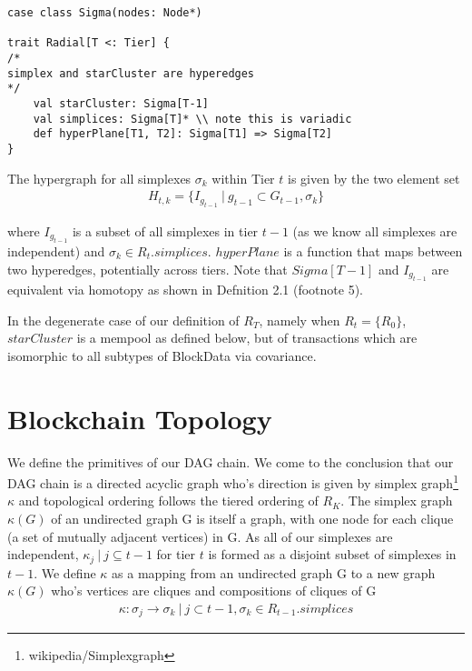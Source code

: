 \documentclass{article}
\begin{document}
\begin{lstlisting}
case class Sigma(nodes: Node*)

trait Radial[T <: Tier] {
/*
simplex and starCluster are hyperedges
*/
	val starCluster: Sigma[T-1]
	val simplices: Sigma[T]* \\ note this is variadic
	def hyperPlane[T1, T2]: Sigma[T1] => Sigma[T2]
}
\end{lstlisting}

The hypergraph for all simplexes $\sigma_k$ within Tier $t$ is given by the two element set
\begin{equation} \label{eq1}
\begin{split}
H_{t,k} = \{I_{g_{t-1}} \ | \ g_{t-1} \subset G_{t-1}, \sigma_k \}
\end{split}
\end{equation}

where $I_{g_{t-1}}$ is a subset of all simplexes in tier $t-1$ (as we know all simplexes are independent) and $\sigma_k \in R_t.simplices$. $hyperPlane$ is a function that maps between two hyperedges, potentially across tiers. Note that $Sigma[T-1]$ and $I_{g_{t-1}}$ are equivalent via homotopy as shown in Defnition 2.1 (footnote 5). 

In the degenerate case of our definition of $R_T$, namely when $R_t = \{R_0\}$, $starCluster$ is a mempool as defined below, but of transactions which are isomorphic to all subtypes of BlockData via covariance.

\section{Blockchain Topology}
We define the primitives of our DAG chain. We come to the conclusion that our DAG chain is a directed acyclic graph who's direction is given by simplex graph\footnote{wikipedia/Simplexgraph} $\kappa$ and topological ordering follows the tiered ordering of $R_K$. The simplex graph $\kappa(G)$ of an undirected graph G is itself a graph, with one node for each clique (a set of mutually adjacent vertices) in G. As all of our simplexes are independent, $\kappa_j \ | \ j \subseteq t-1$ for tier $t$ is formed as a disjoint subset of simplexes in $t-1$. We define $\kappa$ as a mapping from an undirected graph G to a new graph $\kappa(G)$ who's vertices are cliques and compositions of cliques of G
\begin{equation} \label{eq1}
\begin{split}
\kappa: \sigma_j \rightarrow \sigma_k \ | \ j \subset t-1, \sigma_k \in R_{t-1}.simplices
\end{split}
\end{equation}
\end{document}
